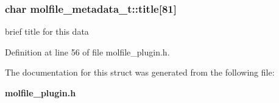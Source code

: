\subsubsection{\setlength{\rightskip}{0pt plus 5cm}char molfile\_\-metadata\_\-t::title[81]}\label{structmolfile__metadata__t_m3}


brief title for this data 

Definition at line 56 of file molfile\_\-plugin.h.

The documentation for this struct was generated from the following file:\begin{CompactItemize}
\item 
{\bf molfile\_\-plugin.h}\end{CompactItemize}
